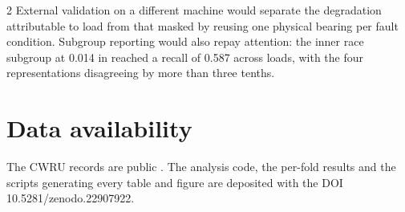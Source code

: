 \documentclass[12pt,twoside,titlepage]{ingenius}
\begin{document}
\begin{multicols}{2}
External validation on a different machine would separate the degradation
attributable to load from that masked by reusing one physical bearing per fault
condition. Subgroup reporting would also repay attention: the inner race
subgroup at 0.014 in reached a recall of 0.587 across loads, with the four
representations disagreeing by more than three tenths.

\section*{Data availability}

The CWRU records are public \cite{cwru}. The analysis code, the per-fold results
and the scripts generating every table and figure are deposited with the DOI
10.5281/zenodo.22907922.



\end{multicols}
\end{document}
